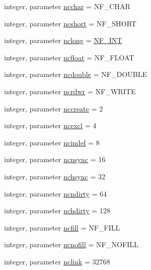 \begin{DoxyCompactItemize}
integer, parameter \hyperlink{namespacenetcdf__nf__data_a53599db94e3b9cc94d5190dbb56bf1d7}{ncchar} = N\+F\+\_\+\+C\+H\+AR
\item 
integer, parameter \hyperlink{namespacenetcdf__nf__data_a61a645d51c75f3799902d5ad2ec1d35f}{ncshort} = N\+F\+\_\+\+S\+H\+O\+RT
\item 
integer, parameter \hyperlink{namespacenetcdf__nf__data_a0da55fa021c2f3d2712d1ec30c4973d3}{nclong} = \hyperlink{ncfortran_8h_aec6fe8ae8c73cf5133d4ed64f86ff028}{N\+F\+\_\+\+I\+NT}
\item 
integer, parameter \hyperlink{namespacenetcdf__nf__data_a9386c299382dba5511b511942e5093dc}{ncfloat} = N\+F\+\_\+\+F\+L\+O\+AT
\item 
integer, parameter \hyperlink{namespacenetcdf__nf__data_a1a23437ca0df858742316afd15a5c469}{ncdouble} = N\+F\+\_\+\+D\+O\+U\+B\+LE
\item 
integer, parameter \hyperlink{namespacenetcdf__nf__data_a99ab1d7f43d8b65e526f4258ccc9ad9a}{ncrdwr} = N\+F\+\_\+\+W\+R\+I\+TE
\item 
integer, parameter \hyperlink{namespacenetcdf__nf__data_a0cfdf3960977338f3e877e4e48f92d85}{nccreate} = 2
\item 
integer, parameter \hyperlink{namespacenetcdf__nf__data_a879f774dc85e4c3dc3387b7df34ab161}{ncexcl} = 4
\item 
integer, parameter \hyperlink{namespacenetcdf__nf__data_aca4bed95537c20a2d370948685a373af}{ncindef} = 8
\item 
integer, parameter \hyperlink{namespacenetcdf__nf__data_a110301c6c9811906ce8044a3fbf09b5b}{ncnsync} = 16
\item 
integer, parameter \hyperlink{namespacenetcdf__nf__data_ad2bf346860148061abeeb68421b7bf0c}{nchsync} = 32
\item 
integer, parameter \hyperlink{namespacenetcdf__nf__data_a501e623096ba68a005164d17ec4d8d49}{ncndirty} = 64
\item 
integer, parameter \hyperlink{namespacenetcdf__nf__data_a065a170b2aad8e4e4655cf515b96ff00}{nchdirty} = 128
\item 
integer, parameter \hyperlink{namespacenetcdf__nf__data_aed7a397c61803778ca06e67dc5c039de}{ncfill} = N\+F\+\_\+\+F\+I\+LL
\item 
integer, parameter \hyperlink{namespacenetcdf__nf__data_ac041023d4eb6ad4fbfc17d19791c34b0}{ncnofill} = N\+F\+\_\+\+N\+O\+F\+I\+LL
\item 
integer, parameter \hyperlink{namespacenetcdf__nf__data_aa409f012252d130729e94dddd572e375}{nclink} = 32768

\end{DoxyCompactItemize}
